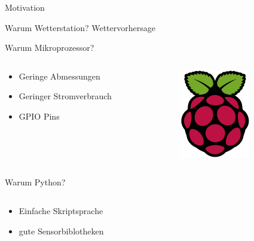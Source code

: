 \begin{frame}[t]{Motivation}
	\begin{block}{Warum Wetterstation?}
		Wettervorhersage
	\end{block}
	\begin{block}{Warum Mikroprozessor?}
		\begin{columns}[onlytextwidth]
			\begin{column}{0.8\textwidth}
		\begin{itemize}
			\item Geringe Abmessungen
			\item Geringer Stromverbrauch
			\item GPIO Pins
		\end{itemize}
			\end{column}
			\begin{column}{0.2\textwidth}
				\centering
				\vspace{-0.2cm}
				\includegraphics[width=0.5\linewidth]{picture/raspberry.png}
			\end{column}
		\end{columns}
	\end{block}
	\begin{block}{Warum Python?}
		\begin{columns}[onlytextwidth]
			\begin{column}{0.8\textwidth}
				\begin{itemize}
					\item Einfache Skriptsprache
					\item gute Sensorbiblotheken
				\end{itemize}
			\end{column}
			\begin{column}{0.2\textwidth}
				\centering

\end{column}
\end{columns}
\end{block}
\end{frame}
